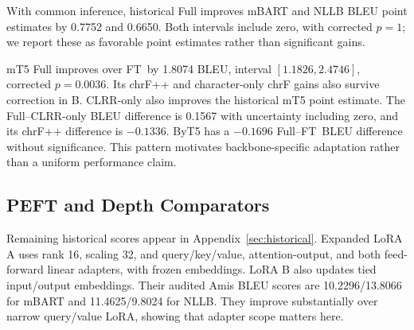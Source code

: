 \documentclass[11pt]{article}
\newcommand{\FT}{\textsc{FT}}
\begin{document}
\begin{table}[!ht]
\centering
\caption{Paired sentence bootstrap for B: 10,000 resamples, percentile intervals, Original Holm correction across 36 tests, retained unchanged when reporting the Amis subset. FT denotes full fine-tuning and Full denotes CLRR+LSR. This does not measure uncertainty across training seeds.}
\label{tab:historical_tests}
\renewcommand{\arraystretch}{1.15}
\end{table}
With common inference, historical Full improves mBART and NLLB BLEU point estimates by 0.7752 and 0.6650. Both intervals include zero, with corrected $p=1$; we report these as favorable point estimates rather than significant gains.

mT5 Full improves over \FT\ by 1.8074 BLEU, interval $[1.1826,2.4746]$, corrected $p=0.0036$. Its chrF++ and character-only chrF gains also survive correction in B. CLRR-only also improves the historical mT5 point estimate. The Full--CLRR-only BLEU difference is 0.1567 with uncertainty including zero, and its chrF++ difference is $-0.1336$. ByT5 has a $-0.1696$ Full--\FT\ BLEU difference without significance. This pattern motivates backbone-specific adaptation rather than a uniform performance claim.

\subsection{PEFT and Depth Comparators}
Remaining historical scores appear in Appendix~\ref{sec:historical}. Expanded LoRA A uses rank 16, scaling 32, and query/key/value, attention-output, and both feed-forward linear adapters, with frozen embeddings. LoRA B also updates tied input/output embeddings. Their audited Amis BLEU scores are 10.2296/13.8066 for mBART and 11.4625/9.8024 for NLLB. They improve substantially over narrow query/value LoRA, showing that adapter scope matters here.
\end{document}

